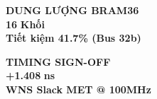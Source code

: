 \documentclass[10pt]{article}
\begin{document}
\begin{minipage}[t]{0.158\textwidth}
    \begin{tcolorbox}[kpibox={socPurple}{socPurpleLight}, width=\linewidth]
        {\fontsize{7}{8}\selectfont \textbf{\color{socPurple}DUNG LƯỢNG BRAM36}}\\[1.5pt]
        {\fontsize{21}{23}\selectfont \textbf{\color{socPurple}16}} {\fontsize{10}{11}\selectfont \textbf{\color{socPurple}Khối}}\\[1.5pt]
        {\fontsize{6.5}{7.5}\selectfont \textbf{\color{socPurple!80!black}Tiết kiệm 41.7\% (Bus 32b)}}
    \end{tcolorbox}
\end{minipage}\hfill
\begin{minipage}[t]{0.158\textwidth}
    \begin{tcolorbox}[kpibox={socIndigo}{socIndigoLight}, width=\linewidth]
        {\fontsize{7}{8}\selectfont \textbf{\color{socIndigo}TIMING SIGN-OFF}}\\[1.5pt]
        {\fontsize{21}{23}\selectfont \textbf{\color{socIndigo}+1.408}} {\fontsize{10}{11}\selectfont \textbf{\color{socIndigo}ns}}\\[1.5pt]
        {\fontsize{6.5}{7.5}\selectfont \textbf{\color{socIndigo!80!black}WNS Slack MET @ 100MHz}}
    \end{tcolorbox}
\end{minipage}

\vspace{2.6mm}
\end{document}
